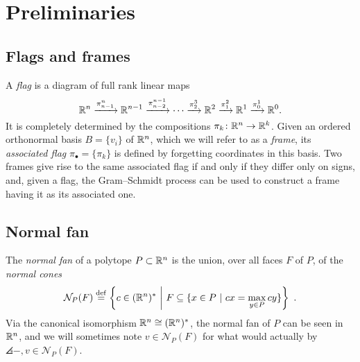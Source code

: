 
\section{Preliminaries}

\subsection{Flags and frames}

A \emph{flag} is a diagram of full rank linear maps
\[
\mathbb{R}^n \xrightarrow{\pi^n_{n-1}} \mathbb{R}^{n-1} \xrightarrow{\pi^{n-1}_{n-2}} \dotsb \xrightarrow{\pi^3_{2}} \mathbb{R}^2 \xrightarrow{\pi^2_1} \mathbb{R}^1 \xrightarrow{\pi^1_0} \mathbb{R}^0.
\]
It is completely determined by the compositions
$\pi_k \colon \mathbb{R}^n \to \mathbb{R}^k$.
Given an ordered orthonormal basis $B = \{v_i\}$ of $\mathbb{R}^n$, which we will refer to as a \textit{frame}, its \emph{associated flag} $\pi_\bullet = \{\pi_k\}$ is defined by forgetting coordinates in this basis.
Two frames give rise to the same associated flag if and only if they differ only on signs, and, given a flag, the Gram--Schmidt process can be used to construct a frame having it as its associated one.

%

\subsection{Normal fan}

The \emph{normal fan} of a polytope $P \subset \mathbb{R}^n$ is the union, over all faces $F$ of $P$, of the \emph{normal cones} 
\[
\mathcal{N}_P(F) \stackrel{\mathrm{def}}{=} \left\{ c \in (\mathbb{R}^n)^{*} \ \bigg | \ F \subseteq \{ x \in P \ | \ c x =\max_{y \in P} c y \}\right\}  \ . 
\] 
Via the canonical isomorphism $\mathbb{R}^n \cong (\mathbb{R}^n)^{*}$, the normal fan of $P$ can be seen in $\mathbb{R}^n$, and we will sometimes note $v \in \mathcal{N}_P(F)$ for what would actually by $\angles{-,v} \in \mathcal{N}_P(F)$. 
